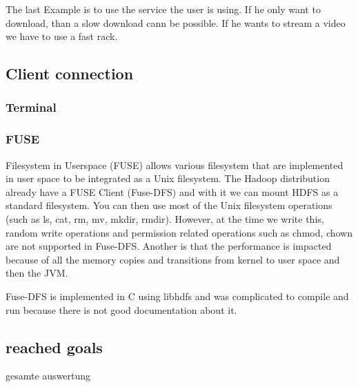 The last Example is to use the service the user is using. If he only want to download, than a slow download cann be possible. If he wants to stream a video we have to use a fast rack.

\subsection{Client connection}
\label{sec:hdfs_client}
\subsubsection{Terminal}
\subsubsection{FUSE}

Filesystem in Userspace (FUSE) allows various filesystem that are implemented in user space to be integrated as a Unix filesystem. The Hadoop distribution already have a FUSE Client (Fuse-DFS) and with it we can mount HDFS as a standard filesystem. You can then use most of the Unix filesystem operations (such as ls, cat, rm, mv, mkdir, rmdir). However, at the time we write this, random write operations and permission related operations such as chmod, chown are not supported in Fuse-DFS. Another is that the performance is impacted because of all the memory copies and transitions from kernel to user space and then the JVM.

Fuse-DFS is implemented in C using libhdfs and was complicated to compile and run because there is not good documentation about it.
\subsection{reached goals}
gesamte auswertung





